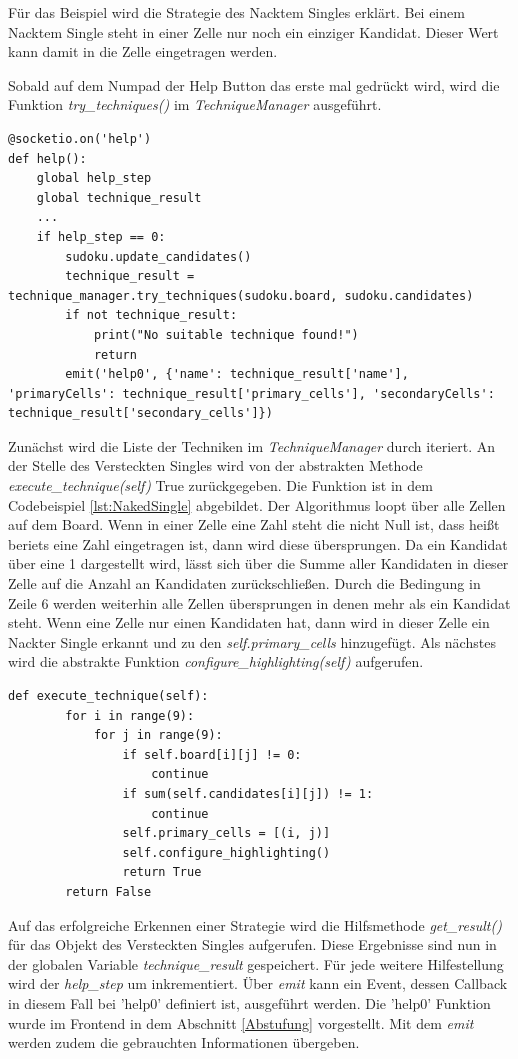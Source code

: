 Für das Beispiel wird die Strategie des Nacktem Singles erklärt. Bei einem Nacktem Single steht in einer Zelle nur noch ein einziger Kandidat. Dieser Wert kann damit in die Zelle eingetragen werden.

Sobald auf dem Numpad der Help Button das erste mal gedrückt wird, wird die Funktion \textit{try\_techniques()} im \textit{TechniqueManager} ausgeführt. 
\begin{lstlisting}[caption={Serverseitig help}, label={lst:helper}]
@socketio.on('help')
def help():
	global help_step
	global technique_result
	...
	if help_step == 0:
		sudoku.update_candidates()
		technique_result = technique_manager.try_techniques(sudoku.board, sudoku.candidates)
		if not technique_result:
			print("No suitable technique found!")
			return
		emit('help0', {'name': technique_result['name'], 'primaryCells': technique_result['primary_cells'], 'secondaryCells': technique_result['secondary_cells']})
\end{lstlisting}

Zunächst wird die Liste der Techniken im \textit{TechniqueManager} durch iteriert. An der Stelle des Versteckten Singles wird von der abstrakten Methode \textit{execute\_technique(self)} True zurückgegeben. Die Funktion ist in dem Codebeispiel \ref{lst:NakedSingle} abgebildet. Der Algorithmus loopt über alle Zellen auf dem Board. Wenn in einer Zelle eine Zahl steht die nicht Null ist, dass heißt beriets eine Zahl eingetragen ist, dann wird diese übersprungen. Da ein Kandidat über eine 1 dargestellt wird, lässt sich über die Summe aller Kandidaten in dieser Zelle auf die Anzahl an Kandidaten zurückschließen. Durch die Bedingung in Zeile 6 werden weiterhin alle Zellen übersprungen in denen mehr als ein Kandidat steht. Wenn eine Zelle nur einen Kandidaten hat, dann wird in dieser Zelle ein Nackter Single erkannt und zu den \textit{self.primary\_cells} hinzugefügt. Als nächstes wird die abstrakte Funktion \textit{configure\_highlighting(self)} aufgerufen. 

\begin{lstlisting}[caption={Nackter Single}, label={lst:NakedSingle}]
	def execute_technique(self):
		for i in range(9):
			for j in range(9):
				if self.board[i][j] != 0:
					continue
				if sum(self.candidates[i][j]) != 1:
					continue
				self.primary_cells = [(i, j)]
				self.configure_highlighting()
				return True
		return False
\end{lstlisting}

Auf das erfolgreiche Erkennen einer Strategie wird die Hilfsmethode \textit{get\_result()} für das Objekt des Versteckten Singles aufgerufen. Diese Ergebnisse sind nun in der globalen Variable \textit{technique\_result} gespeichert. Für jede weitere Hilfestellung wird der \textit{help\_step} um inkrementiert. Über \textit{emit} kann ein Event, dessen Callback in diesem Fall bei 'help0' definiert ist, ausgeführt werden. Die 'help0' Funktion wurde im Frontend in dem Abschnitt \ref{Abstufung} vorgestellt. Mit dem \textit{emit} werden zudem die gebrauchten Informationen übergeben.

